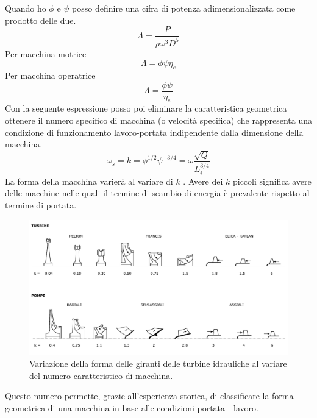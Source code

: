 Quando ho $\phi$ e $\psi$ posso definire una cifra di potenza adimensionalizzata come prodotto delle due.
\begin{equation}
\Lambda = \frac{P}{\rho \omega^3 D^5}
\end{equation}
Per macchina motrice
\begin{equation}
\Lambda = \phi \psi \eta_e
\end{equation}
Per macchina operatrice
\begin{equation}
\Lambda = \frac{\phi \psi}{\eta_e}
\end{equation}
Con la seguente espressione posso poi eliminare la caratteristica geometrica ottenere il numero specifico di macchina (o velocità specifica) che rappresenta una condizione di funzionamento lavoro-portata indipendente dalla dimensione della macchina. 
\begin{equation}
\omega_s = k = \phi^{1/2} \psi^{-3/4} = \omega \frac{\sqrt{Q}}{L_i^{3/4}}
\end{equation}
La forma della macchina varierà al variare di $k$ . Avere dei $k$ piccoli significa avere delle macchine nelle quali il termine di scambio di energia è prevalente rispetto al termine di portata.
\begin{figure}[h!]
\centering
  \includegraphics[width=\textwidth]{fig/numcar.pdf}
\caption{Variazione della forma delle giranti delle turbine idrauliche al variare del numero caratteristico di macchina.}
\label{fig:numcar}
\end{figure}
Questo numero permette, grazie all'esperienza storica, di classificare la forma geometrica di una macchina in base alle condizioni portata - lavoro.

